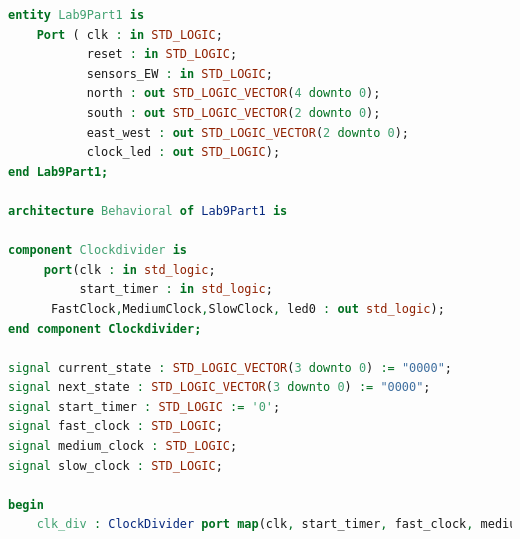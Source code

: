 \documentclass[11pt]{article}
\begin{document}
\begin{appendices}
\begin{lstlisting}[language=VHDL]
entity Lab9Part1 is
    Port ( clk : in STD_LOGIC;
           reset : in STD_LOGIC;
           sensors_EW : in STD_LOGIC;
           north : out STD_LOGIC_VECTOR(4 downto 0);
           south : out STD_LOGIC_VECTOR(2 downto 0);
           east_west : out STD_LOGIC_VECTOR(2 downto 0);
           clock_led : out STD_LOGIC);
end Lab9Part1;

architecture Behavioral of Lab9Part1 is

component Clockdivider is
     port(clk : in std_logic;
          start_timer : in std_logic;
	  FastClock,MediumClock,SlowClock, led0 : out std_logic);
end component Clockdivider;

signal current_state : STD_LOGIC_VECTOR(3 downto 0) := "0000";
signal next_state : STD_LOGIC_VECTOR(3 downto 0) := "0000";
signal start_timer : STD_LOGIC := '0';
signal fast_clock : STD_LOGIC;
signal medium_clock : STD_LOGIC;
signal slow_clock : STD_LOGIC;

begin
    clk_div : ClockDivider port map(clk, start_timer, fast_clock, medium_clock, slow_clock, clock_led);
    

\end{lstlisting}
\end{appendices}
\end{document}
